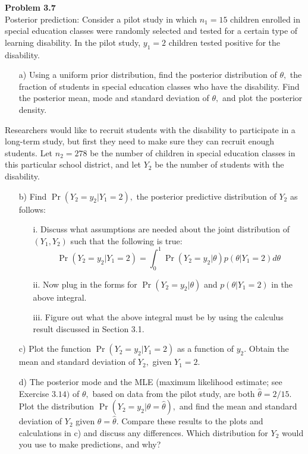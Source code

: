 \documentclass[a4paper, 11pt]{article}
\newenvironment{problem}[2][Problem]
    { \begin{mdframed}[backgroundcolor=gray!20] \textbf{#1 #2} \\}
    {  \end{mdframed}}
\begin{document}
\begin{problem}{3.7}
Posterior prediction: Consider a pilot study in which $n_{1}=15$ children enrolled in special education classes were randomly selected and tested for a certain type of learning disability. In the pilot study, $y_{1}=2$ children tested positive for the disability.
\begin{enumerate}[leftmargin=*, parsep=0pt,itemsep=0pt, topsep=0pt]
	\item [a)] Using a uniform prior distribution, find the posterior distribution of
	$\theta,$ the fraction of students in special education classes who have the disability. Find the posterior mean, mode and standard deviation of
	$\theta,$ and plot the posterior density.
\end{enumerate}
Researchers would like to recruit students with the disability to participate in a long-term study, but first they need to make sure they can recruit enough students. Let $n_{2}=278$ be the number of children in special education classes in this particular school district, and let $Y_{2}$ be the number of students with the disability.
\begin{enumerate}[leftmargin=*, parsep=0pt,itemsep=0pt, topsep=0pt]
	\item [b)] Find $\operatorname{Pr}\left(Y_{2}=y_{2} | Y_{1}=2\right),$ the posterior predictive distribution of $Y_{2}$
	as follows:
	\begin{enumerate}[leftmargin=*, parsep=0pt,itemsep=0pt, topsep=0pt]
		\item [i.] Discuss what assumptions are needed about the joint distribution
		of $\left(Y_{1}, Y_{2}\right)$ such that the following is true:
		$$
		\operatorname{Pr}\left(Y_{2}=y_{2} | Y_{1}=2\right)=\int_{0}^{1} \operatorname{Pr}\left(Y_{2}=y_{2} | \theta\right) p\left(\theta | Y_{1}=2\right) d \theta
		$$
		\item[ii.] Now plug in the forms for $\operatorname{Pr}\left(Y_{2}=y_{2} | \theta\right)$ and $p\left(\theta | Y_{1}=2\right)$ in the above integral.
		\item[iii.] Figure out what the above integral must be by using the calculus result discussed in Section 3.1.
		
	\end{enumerate}

	\item[c)] Plot the function $\operatorname{Pr}\left(Y_{2}=y_{2} | Y_{1}=2\right)$ as a function of $y_{2} .$ Obtain the mean and standard deviation of $Y_{2},$ given $Y_{1}=2$.
	\item[d)] The posterior mode and the MLE (maximum likelihood estimate; see Exercise $3.14)$ of $\theta,$ based on data from the pilot study, are both $\hat{\theta}=2 / 15 .$ Plot the distribution $\operatorname{Pr}(Y_{2}=y_{2} | \theta=\hat{\theta}),$ and find the mean and standard deviation of $Y_{2}$ given $\theta=\hat{\theta} .$ Compare these results to the plots and calculations in c) and discuss any differences. Which distribution for $Y_{2}$ would you use to make predictions, and why?
\end{enumerate}

\end{problem}
\end{document}
